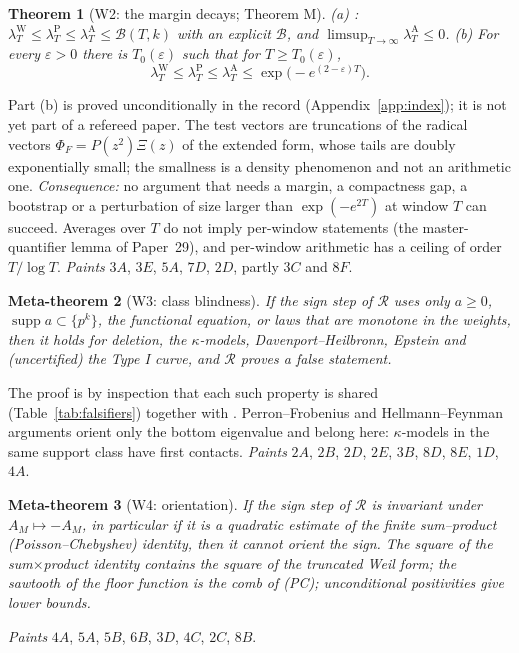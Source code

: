 \documentclass[11pt]{amsart}
\newtheorem{theorem}{Theorem}[section]
\newtheorem{metatheorem}[theorem]{Meta-theorem}
\theoremstyle{definition}
\theoremstyle{remark}
\newcommand{\supp}{\operatorname{supp}}
\newcommand{\lamA}{\lambda^{\mathrm A}_T}
\newcommand{\lamW}{\lambda^{\mathrm W}_T}
\begin{document}
\begin{theorem}[W2: the margin decays; Theorem M]\label{thm:M}
(a) \cite[Thm.~11.5]{Paper47}: $\lamW\le\lambda^{\mathrm P}_T\le\lamA\le\mathcal B(T,k)$ with an
explicit $\mathcal B$, and $\limsup_{T\to\infty}\lamA\le0$.
(b) For every $\varepsilon>0$ there is $T_0(\varepsilon)$ such that for $T\ge T_0(\varepsilon)$,
\[
\lamW\le\lambda^{\mathrm P}_T\le\lamA\le\exp\!\big(-e^{(2-\varepsilon)T}\big).
\]
\end{theorem}
\noindent Part (b) is proved unconditionally in the record (Appendix~\ref{app:index}); it is not yet part of a
refereed paper. The test vectors are truncations of the radical vectors $\Phi_F=P(z^2)\Xi(z)$ of the
extended form, whose tails are doubly exponentially small; the smallness is a density phenomenon and not
an arithmetic one. \emph{Consequence:} no argument that needs a margin, a compactness gap, a bootstrap or
a perturbation of size larger than $\exp(-e^{2T})$ at window $T$ can succeed. Averages over $T$ do not
imply per-window statements (the master-quantifier lemma of Paper~29), and per-window arithmetic has a
ceiling of order $T/\log T$.
\emph{Paints} $3A$, $3E$, $5A$, $7D$, $2D$, partly $3C$ and $8F$.

\begin{metatheorem}[W3: class blindness]\label{W3}
If the sign step of $\mathcal R$ uses only $a\ge0$, $\supp a\subset\{p^k\}$, the functional equation, or laws
that are monotone in the weights, then it holds for deletion, the $\kappa$-models, Davenport--Heilbronn,
Epstein and (uncertified) the Type I curve, and $\mathcal R$ proves a false statement.
\end{metatheorem}
\noindent The proof is by inspection that each such property is shared (Table~\ref{tab:falsifiers}) together with
\cite[Thm.~12.5]{Paper47}. Perron--Frobenius and Hellmann--Feynman arguments orient only the
bottom eigenvalue and belong here: $\kappa$-models in the same support class have first contacts.
\emph{Paints} $2A$, $2B$, $2D$, $2E$, $3B$, $8D$, $8E$, $1D$, $4A$.

\begin{metatheorem}[W4: orientation]\label{W4}
If the sign step of $\mathcal R$ is invariant under $A_M\mapsto-A_M$, in particular if it is a quadratic
estimate of the finite sum--product (Poisson--Chebyshev) identity, then it cannot orient the sign. The
square of the sum$\times$product identity contains the square of the truncated Weil form; the sawtooth of
the floor function is the comb of (PC); unconditional positivities give lower bounds.
\end{metatheorem}
\noindent \emph{Paints} $4A$, $5A$, $5B$, $6B$, $3D$, $4C$, $2C$, $8B$.
\end{document}
